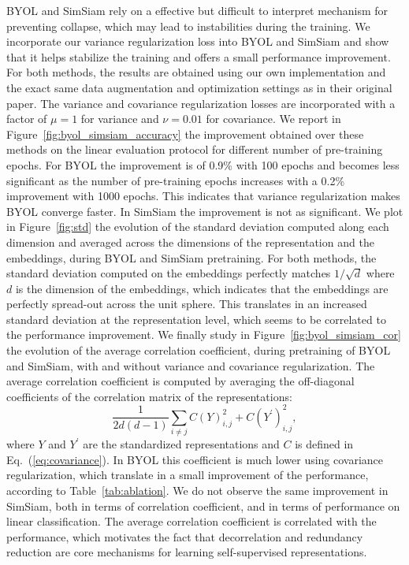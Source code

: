 \documentclass{article}
\begin{document}
BYOL \cite{grill2020byol} and SimSiam \cite{chen2020simsiam} rely on a effective but difficult to interpret mechanism for preventing collapse, which may lead to instabilities during the training. We incorporate our variance regularization loss into BYOL and SimSiam and show that it helps stabilize the training and offers a small performance improvement. For both methods, the results are obtained using our own implementation and the exact same data augmentation and optimization settings as in their original paper. The variance and covariance regularization losses are incorporated with a factor of $\mu=1$ for variance and $\nu=0.01$ for covariance. We report in Figure~\ref{fig:byol_simsiam_accuracy} the improvement obtained over these methods on the linear evaluation protocol for different number of pre-training epochs. For BYOL the improvement is of 0.9\% with 100 epochs and becomes less significant as the number of pre-training epochs increases with a 0.2\% improvement with 1000 epochs. This indicates that variance regularization makes BYOL converge faster. In SimSiam the improvement is not as significant. We plot in Figure~\ref{fig:std} the evolution of the standard deviation computed along each dimension and averaged across the dimensions of the representation and the embeddings, during BYOL and SimSiam pretraining. For both methods, the standard deviation computed on the embeddings perfectly matches $1/\sqrt{d}$ where $d$ is the dimension of the embeddings, which indicates that the embeddings are perfectly spread-out across the unit sphere. This translates in an increased standard deviation at the representation level, which seems to be correlated to the performance improvement. We finally study in Figure~\ref{fig:byol_simsiam_cor} the evolution of the average correlation coefficient, during pretraining of BYOL and SimSiam, with and without variance and covariance regularization. The average correlation coefficient is computed by averaging the off-diagonal coefficients of the correlation matrix of the representations:
\begin{equation}
    \frac{1}{2d(d-1)} \sum_{i \ne j} C(Y)_{i,j}^2 + C(Y^{\prime})_{i,j}^2,
\end{equation}
where $Y$ and $Y^{\prime}$ are the standardized representations and $C$ is defined in Eq.~(\ref{eq:covariance}). In BYOL this coefficient is much lower using covariance regularization, which translate in a small improvement of the performance, according to Table~\ref{tab:ablation}. We do not observe the same improvement in SimSiam, both in terms of correlation coefficient, and in terms of performance on linear classification. The average correlation coefficient is correlated with the performance, which motivates the fact that decorrelation and redundancy reduction are core mechanisms for learning self-supervised representations.
\end{document}
